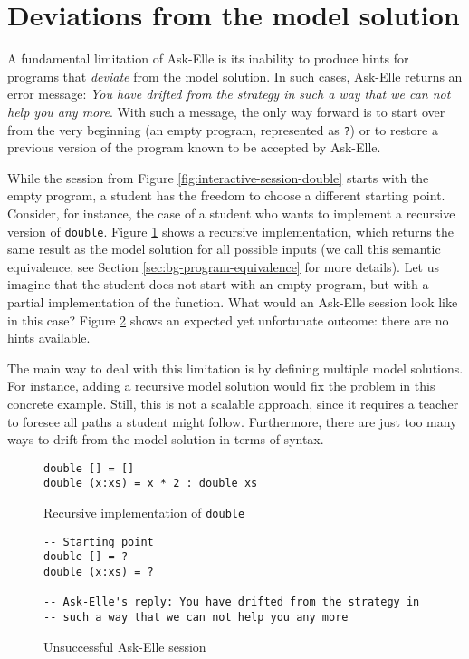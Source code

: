 \section{Deviations from the model solution}
\label{sec:intro-fundamental-limitation}

A fundamental limitation of Ask-Elle is its inability to produce hints for programs that \emph{deviate} from the model solution. In such cases, Ask-Elle returns an error message: \emph{You have drifted from the strategy in such a way that we can not help you any more}. With such a message, the only way forward is to start over from the very beginning (an empty program, represented as \texttt{?}) or to restore a previous version of the program known to be accepted by Ask-Elle.

While the session from Figure \ref{fig:interactive-session-double} starts with the empty program, a student has the freedom to choose a different starting point. Consider, for instance, the case of a student who wants to implement a recursive version of \texttt{double}. Figure \ref{fig:limitations-recursive-double} shows a recursive implementation, which returns the same result as the model solution for all possible inputs (we call this semantic equivalence, see Section \ref{sec:bg-program-equivalence} for more details). Let us imagine that the student does not start with an empty program, but with a partial implementation of the function. What would an Ask-Elle session look like in this case? Figure \ref{fig:limitations-askelle-example-session} shows an expected yet unfortunate outcome: there are no hints available.

The main way to deal with this limitation is by defining multiple model solutions. For instance, adding a recursive model solution would fix the problem in this concrete example. Still, this is not a scalable approach, since it requires a teacher to foresee all paths a student might follow. Furthermore, there are just too many ways to drift from the model solution in terms of syntax.

\begin{figure}
\begin{verbatim}
double [] = []
double (x:xs) = x * 2 : double xs
\end{verbatim}
\caption{Recursive implementation of \texttt{double}}
\label{fig:limitations-recursive-double}
\end{figure}

\begin{figure}
\begin{verbatim}
-- Starting point
double [] = ?
double (x:xs) = ?

-- Ask-Elle's reply: You have drifted from the strategy in
-- such a way that we can not help you any more
\end{verbatim}
\caption{Unsuccessful Ask-Elle session}
\label{fig:limitations-askelle-example-session}
\end{figure}

